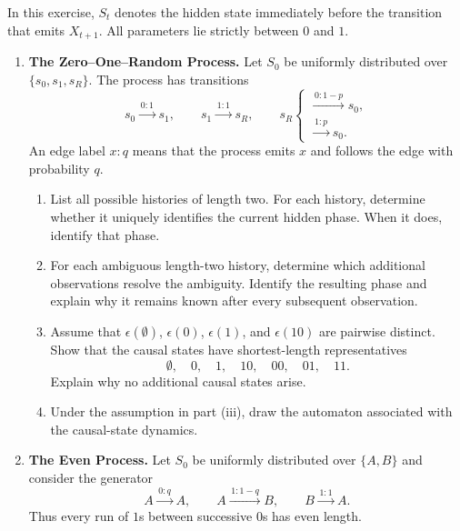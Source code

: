 \documentclass[11pt]{article}
\begin{document}
\begin{exercise}
\label{ex:p2-3}
  In this exercise, $S_t$ denotes the hidden state immediately before the
  transition that emits $X_{t+1}$. All parameters lie strictly between $0$
  and $1$.

  \begin{enumerate}
    \item \textbf{The Zero--One--Random Process.}
      Let $S_0$ be uniformly distributed over
      $\{s_0,s_1,s_R\}$. The process has transitions
      \[
        s_0\xrightarrow{\,0:1\,}s_1,
        \qquad
        s_1\xrightarrow{\,1:1\,}s_R,
        \qquad
        s_R
        \begin{cases}
          \xrightarrow{\,0:1-p\,}s_0,\\[-1mm]
          \xrightarrow{\,1:p\,}s_0.
        \end{cases}
      \]
      An edge label $x:q$ means that the process emits $x$ and follows the
      edge with probability $q$.

      \begin{enumerate}
        \item List all possible histories of length two. For each history,
          determine whether it uniquely identifies the current hidden phase.
          When it does, identify that phase.

        \item For each ambiguous length-two history, determine which
          additional observations resolve the ambiguity. Identify the
          resulting phase and explain why it remains known after every
          subsequent observation.

        \item Assume that $\epsilon(\emptyset)$, $\epsilon(0)$,
          $\epsilon(1)$, and $\epsilon(10)$ are pairwise distinct. Show that
          the causal states have shortest-length representatives
          \[
            \emptyset,\quad 0,\quad 1,\quad 10,\quad 00,\quad 01,\quad 11.
          \]
          Explain why no additional causal states arise.

        \item Under the assumption in part (iii), draw the automaton
          associated with the causal-state dynamics.
      \end{enumerate}

    \item \textbf{The Even Process.}
      Let $S_0$ be uniformly distributed over $\{A,B\}$ and consider the
      generator
      \[
        A\xrightarrow{\,0:q\,}A,
        \qquad
        A\xrightarrow{\,1:1-q\,}B,
        \qquad
        B\xrightarrow{\,1:1\,}A.
      \]
      Thus every run of $1$s between successive $0$s has even length.


\end{enumerate}
\end{exercise}
\end{document}
